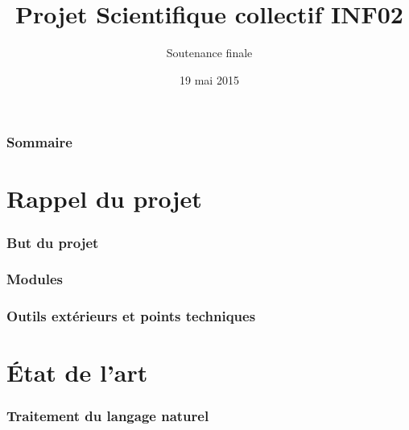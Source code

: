 \documentclass[12pt]{beamer}
\title{Projet Scientifique collectif INF02}
\subtitle{Soutenance finale}
\author{}
\date{19 mai 2015}
\begin{document}

    \begin{frame}
      \maketitle
    \end{frame}		


    \begin{frame}
      \frametitle{Sommaire}
      \tableofcontents
    \end{frame}

\section{Rappel du projet}

\begin{frame}
 \frametitle{But du projet}
 

\end{frame}

\begin{frame}
 \frametitle{Modules}
 
 
\end{frame}


\begin{frame}
 \frametitle{Outils extérieurs et points techniques}
 
 
\end{frame}

\section{État de l'art}

\begin{frame}
 \frametitle{Traitement du langage naturel}
 
 
\end{frame}
\end{document}
